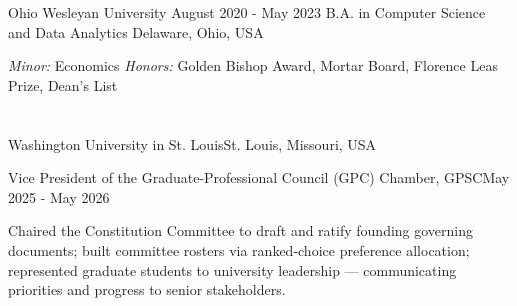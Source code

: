 \documentclass[10pt, letterpaper]{article}
\begin{document}
\vspace{\entrySpacing}
\begin{educationentry}
	{Ohio Wesleyan University}
	{August 2020 - May 2023}
	{B.A. in Computer Science and Data Analytics}
	{Delaware, Ohio, USA}
\begin{highlightsforbulletentries}
\item \textit{Minor:} Economics \textbar{} \textit{Honors:} Golden Bishop Award, Mortar Board, Florence Leas Prize, Dean's List
\end{highlightsforbulletentries}
\end{educationentry}

\vspace{\headerSpacing}


\section{}

\vspace{\entrySpacing}
\begin{leadershipentry}{Washington University in St. Louis}{St. Louis, Missouri, USA}
	\begin{positionentry}{Vice President of the Graduate-Professional Council (GPC) Chamber, GPSC}{May 2025 - May 2026}
		\item Chaired the Constitution Committee to draft and ratify founding governing documents; built committee rosters via ranked-choice preference allocation; represented graduate students to university leadership --- communicating priorities and progress to senior stakeholders.
	\end{positionentry}
\end{leadershipentry}

\end{document}
